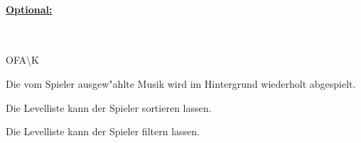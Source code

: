 %
%
\paragraph*{\underline{Optional:}}~\\


\begin{ids}{\gls{OFA\K}}

	\id[ 360] Die vom Spieler ausgew{"a}hlte Musik wird im Hintergrund wiederholt abgespielt.
	
	\id[ 370] Die Levelliste kann der Spieler sortieren lassen.
	
	\id[ 380] Die Levelliste kann der Spieler filtern lassen.
	
\end{ids}


